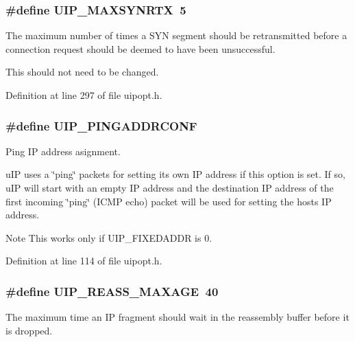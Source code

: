 \hypertarget{group__uipopt_ga24aa5bc36939cc9a0833e1df01478a7e}{
\subsubsection[{UIP\_\-MAXSYNRTX}]{\setlength{\rightskip}{0pt plus 5cm}\#define UIP\_\-MAXSYNRTX~5}}
\label{group__uipopt_ga24aa5bc36939cc9a0833e1df01478a7e}
The maximum number of times a SYN segment should be retransmitted before a connection request should be deemed to have been unsuccessful.

This should not need to be changed. 

Definition at line 297 of file uipopt.h.

\hypertarget{group__uipopt_ga9069474ea570fd78c481aa164317dbaf}{
\subsubsection[{UIP\_\-PINGADDRCONF}]{\setlength{\rightskip}{0pt plus 5cm}\#define UIP\_\-PINGADDRCONF}}
\label{group__uipopt_ga9069474ea570fd78c481aa164317dbaf}
Ping IP address asignment.

uIP uses a \char`\"{}ping\char`\"{} packets for setting its own IP address if this option is set. If so, uIP will start with an empty IP address and the destination IP address of the first incoming \char`\"{}ping\char`\"{} (ICMP echo) packet will be used for setting the hosts IP address.

\begin{DoxyNote}{Note}
This works only if UIP\_\-FIXEDADDR is 0. 
\end{DoxyNote}


Definition at line 114 of file uipopt.h.

\hypertarget{group__uipopt_gac3882366feda1cb759ccbfe98327a7db}{
\subsubsection[{UIP\_\-REASS\_\-MAXAGE}]{\setlength{\rightskip}{0pt plus 5cm}\#define UIP\_\-REASS\_\-MAXAGE~40}}
\label{group__uipopt_gac3882366feda1cb759ccbfe98327a7db}
The maximum time an IP fragment should wait in the reassembly buffer before it is dropped. 

